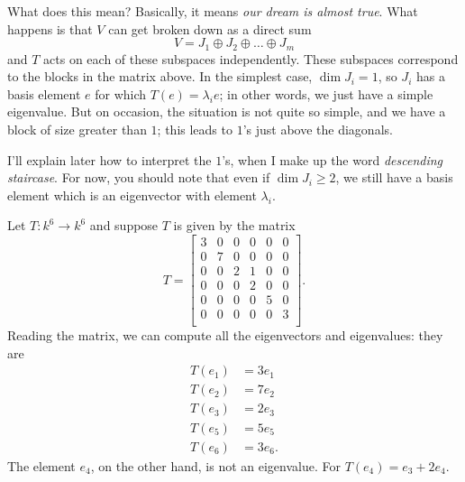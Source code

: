 What does this mean?
Basically, it means \emph{our dream is almost true}.
What happens is that $V$ can get broken down as a direct sum
\[ V = J_1 \oplus J_2 \oplus \dots \oplus J_m \]
and $T$ acts on each of these subspaces independently.
These subspaces correspond to the blocks in the matrix above.
In the simplest case, $\dim J_i = 1$,
so $J_i$ has a basis element $e$
for which $T(e) = \lambda_i e$;
in other words, we just have a simple eigenvalue.
But on occasion, the situation is not quite so simple,
and we have a block of size greater than $1$;
this leads to $1$'s just above the diagonals.

I'll explain later how to interpret the $1$'s,
when I make up the word \emph{descending staircase}.
For now, you should note that even if $\dim J_i \ge 2$,
we still have a basis element
which is an eigenvector with element $\lambda_i$.

\begin{example}
	Let $T : k^6 \to k^6$ and suppose $T$ is given by the matrix
	\[
		T = \begin{bmatrix}
			3 & 0 & 0 & 0 & 0 & 0 \\
			0 & 7 & 0 & 0 & 0 & 0 \\
			0 & 0 & 2 & 1 & 0 & 0 \\
			0 & 0 & 0 & 2 & 0 & 0 \\
			0 & 0 & 0 & 0 & 5 & 0 \\
			0 & 0 & 0 & 0 & 0 & 3 \\
		\end{bmatrix}.
	\]
	Reading the matrix, we can compute all the eigenvectors and eigenvalues:
	they are
	\begin{align*}
		T(e_1) &= 3e_1 \\
		T(e_2) &= 7e_2 \\
		T(e_3) &= 2e_3 \\
		T(e_5) &= 5e_5 \\
		T(e_6) &= 3e_6.
	\end{align*}
	The element $e_4$, on the other hand,
	is not an eigenvalue.
	For $T(e_4) = e_3 + 2e_4$.
\end{example}

%

